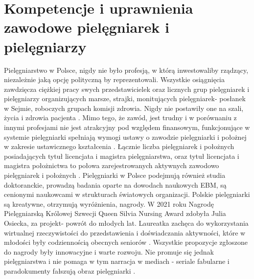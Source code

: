 \documentclass[a4paper,12pt,twoside,openany]{report}
\begin{document}
\section{Kompetencje i uprawnienia zawodowe \newline pielęgniarek i pielęgniarzy}
Pielęgniarstwo w Polsce, nigdy nie było profesją, w którą inwestowaliby rządzący, niezależnie jaką opcję polityczną by reprezentowali. Wszystkie osiągnięcia zawdzięcza ciężkiej pracy swych przedstawicielek oraz licznych grup pielęgniarek i pielęgniarzy organizujących marsze, strajki, monitujących pielęgniarek- posłanek w Sejmie, roboczych grupach komisji zdrowia. Nigdy nie postawiły one na szali, życia i zdrowia pacjenta \cite{strajk}. Mimo tego, że zawód, jest trudny i w porównaniu z innymi profesjami nie jest atrakcyjny pod względem finansowym, funkcjonujące w systemie pielęgniarki spełniają wymogi ustawy o zawodzie pielęgniarki i położnej  w zakresie ustawicznego kształcenia \cite{2011}. Łącznie liczba pielęgniarek i położnych posiadających tytuł licencjata i magistra pielęgniarstwa, oraz tytuł licencjata i magistra położnictwa to połowa zarejestrowanych aktywnych zawodowo pielęgniarek i położnych \cite{ile}. Pielęgniarki w Polsce podejmują również studia doktoranckie, prowadzą badania oparte na dowodach naukowych EBM, są cenionymi naukowcami w strukturach światowych organizacji. Polskie pielęgniarki są kreatywne, otrzymują wyróżnienia, nagrody. W 2021 roku Nagrodę Pielęgniarską Królowej Szwecji Queen Silvia Nursing Award zdobyła Julia Osiecka, za projekt- powrót do młodych lat. Laureatka zachęca do wykorzystania wirtualnej rzeczywistości do przedstawienia i doświadczania aktywności, które w młodości były codziennością obecnych seniorów \cite{julia}. Wszystkie propozycje zgłoszone do nagrody były innowacyjne i warte rozwoju. Nie promuje się jednak  pielęgniarstwa i nie pomaga w tym narracja w mediach - seriale fabularne i paradokumenty fałszują obraz pielęgniarki \cite{postrzeganie}.
\end{document}
